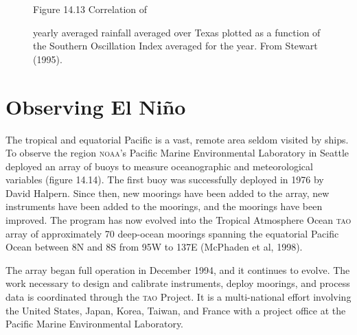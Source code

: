 \begin{figure}[t!]
\centering
\footnotesize
Figure 14.13 Correlation of \rule{0mm}{4ex}yearly averaged rainfall
averaged over Texas plotted as a function of the Southern Oscillation
Index averaged for the year.  From
Stewart (1995).

\label{fig:texasrain}
\vspace{-4ex}
\end{figure}

\section{Observing El Ni\~{n}o}
The tropical
and equatorial Pacific is a vast, remote area seldom visited by
ships. To observe the region \textsc{noaa}'s Pacific Marine
Environmental Laboratory in Seattle deployed an array of buoys to
measure oceanographic and meteorological variables (figure 14.14). The
first buoy was successfully deployed in 1976 by David Halpern. Since
then, new moorings have been added to the array, new instruments have
been added to the moorings, and the moorings have been improved. The
program has now evolved into the Tropical Atmosphere Ocean
\textsc{tao} array of approximately 70 deep-ocean moorings spanning
the equatorial Pacific Ocean between 8\degrees N and 8\degrees S from
95\degrees W to 137\degrees E (McPhaden et al, 1998).

The array began full operation in December 1994, and it continues to
evolve. The work necessary to design and calibrate instruments, deploy
moorings, and process data is coordinated through the \textsc{tao}
Project. It is a multi-national effort involving the United States,
Japan, Korea, Taiwan, and France with a project office at the Pacific
Marine Environmental Laboratory.

